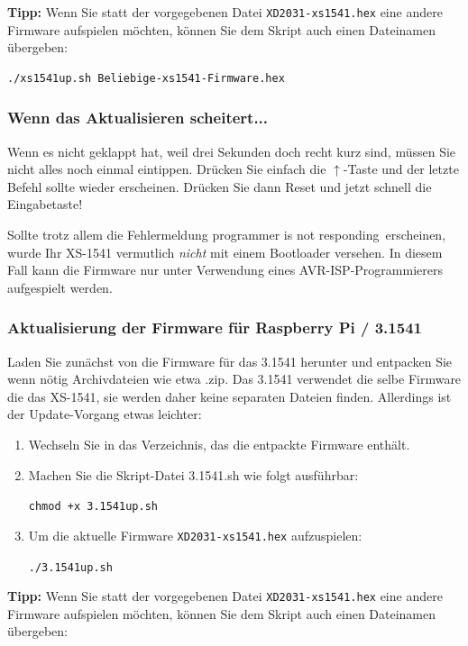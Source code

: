 \documentclass[10pt,a4paper]{scrartcl}		%
\begin{document}
\textbf{Tipp:} Wenn Sie statt der vorgegebenen Datei 
\texttt{XD2031-xs1541.hex}
eine andere Firmware aufspielen möchten, können Sie
dem Skript auch einen Dateinamen übergeben:

\begin{verbatim}
./xs1541up.sh Beliebige-xs1541-Firmware.hex
\end{verbatim}

\subsubsection*{Wenn das Aktualisieren scheitert...}
Wenn es nicht geklappt hat, weil drei Sekunden doch recht kurz sind,
müssen Sie nicht alles noch einmal eintippen. Drücken Sie einfach
die $\uparrow$-Taste und der letzte Befehl sollte
wieder erscheinen. Drücken Sie dann Reset und jetzt schnell die Eingabetaste!

Sollte trotz allem die Fehlermeldung \glqq programmer is not responding\grqq\ 
erscheinen, wurde Ihr XS-1541 vermutlich \textit{nicht} mit einem Bootloader
versehen. In diesem Fall kann die Firmware nur unter Verwendung eines
AVR-ISP-Programmierers aufgespielt werden.



\subsubsection{Aktualisierung der Firmware für Raspberry Pi / 3.1541}
\index{3.1541!Firmware aktualisieren}
\label{fwinst31541}
Laden Sie zunächst von \fwbinaries{} die Firm\-ware für das 3.1541
herunter und entpacken Sie wenn nötig Archivdateien wie etwa \glqq .zip\grqq . 
Das 3.1541 verwendet die selbe Firmware die das XS-1541, sie werden daher
keine separaten Dateien finden. Allerdings ist der Update-Vorgang etwas
leichter:

\begin{enumerate}
\item Wechseln Sie in das Verzeichnis, das die entpackte Firmware enthält.
\item Machen Sie die Skript-Datei 3.1541.sh wie folgt ausführbar:

\texttt{chmod +x 3.1541up.sh}
\item Um die aktuelle Firmware \texttt{XD2031-xs1541.hex} aufzuspielen:

	\texttt{./3.1541up.sh}
\end{enumerate}

\textbf{Tipp:} Wenn Sie statt der vorgegebenen Datei 
\texttt{XD2031-xs1541.hex}
eine andere Firmware aufspielen möchten, können Sie
dem Skript auch einen Dateinamen übergeben:
\end{document}
